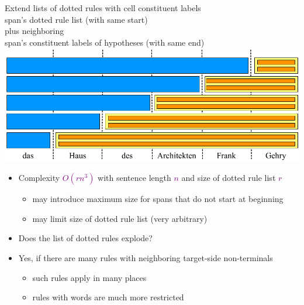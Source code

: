 \documentclass[landscape]{slides}
\newcommand{\maths}[1]{\textcolor{purple}{#1}}
\begin{document}

\begin{center}\vspace{5mm}
Extend lists of dotted rules with cell constituent labels\\[5mm]
span's dotted rule list (with same start)\\ plus neighboring\\ span's constituent labels of hypotheses (with same end)\\[5mm]
\includegraphics[scale=1.4]{accessing-grammar-rules-early-example14.pdf}
\end{center}


\vspace{20mm}
\begin{itemize}\itemsep 10mm
\item Complexity \maths{$O(rn^3)$} with sentence length \maths{$n$} and size of dotted rule list \maths{$r$}
\begin{itemize}
\item may introduce maximum size for spans that do not start at beginning
\item may limit size of dotted rule list (very arbitrary)
\end{itemize}
\item Does the list of dotted rules explode?
\item Yes, if there are many rules with neighboring target-side non-terminals
\begin{itemize}
\item such rules apply in many places
\item rules with words are much more restricted
\end{itemize}
\end{itemize}

\end{document}
